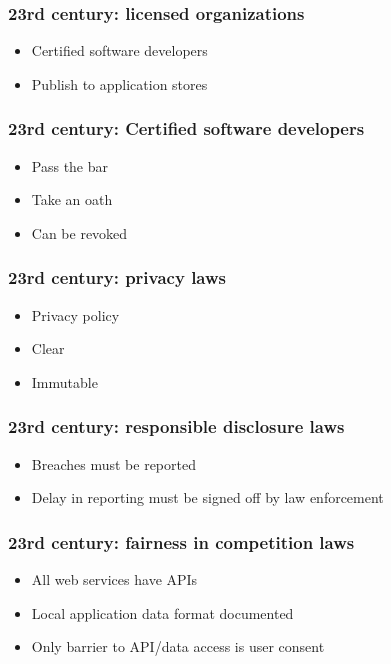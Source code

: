 \begin{frame}[fragile]
\frametitle{23rd century: licensed organizations}

\begin{itemize}
\item Certified software developers
\item Publish to application stores
\end{itemize}

\end{frame}

\begin{frame}[fragile]
\frametitle{23rd century: Certified software developers}

\begin{itemize}
\item Pass the bar
\item Take an oath
\item Can be revoked
\end{itemize}

\end{frame}

\begin{frame}[fragile]
\frametitle{23rd century: privacy laws}

\begin{itemize}
\item Privacy policy
\item Clear
\item Immutable
\end{itemize}

\end{frame}

\begin{frame}[fragile]
\frametitle{23rd century: responsible disclosure laws}

\begin{itemize}
\item Breaches must be reported
\item Delay in reporting must be signed off by law enforcement
\end{itemize}

\end{frame}

\begin{frame}[fragile]
\frametitle{23rd century: fairness in competition laws}

\begin{itemize}
\item All web services have APIs
\item Local application data format documented
\item Only barrier to API/data access is user consent
\end{itemize}

\end{frame}

